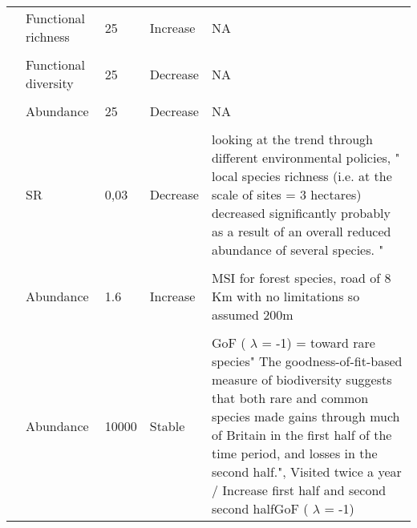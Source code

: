 \documentclass[
  12pt,
  oneside]{report}
\begin{document}
\begin{landscape}
\begin{longtable}[t]{llll>{\raggedright\arraybackslash}p{30em}}
\cite{schipper_contrasting_2016} & Functional richness & 25 & Increase & NA\\
\cellcolor{gray!6}{\cite{schipper_contrasting_2016}} & \cellcolor{gray!6}{Functional evenness} & \cellcolor{gray!6}{25} & \cellcolor{gray!6}{Increase} & \cellcolor{gray!6}{NA}\\
\cite{schipper_contrasting_2016} & Functional diversity & 25 & Decrease & NA\\
\cellcolor{gray!6}{\cite{sorte_changes_2005}} & \cellcolor{gray!6}{SR} & \cellcolor{gray!6}{25} & \cellcolor{gray!6}{Increase} & \cellcolor{gray!6}{The metric is meaned over each road. Area of the road = 50*(pi*400\^2) with 50 census point per road and a census radius of 400m}\\
\addlinespace
\cite{sorte_changes_2005} & Abundance & 25 & Decrease & NA\\
\cellcolor{gray!6}{\cite{sorte_changes_2005}} & \cellcolor{gray!6}{Diversity} & \cellcolor{gray!6}{25} & \cellcolor{gray!6}{Decrease} & \cellcolor{gray!6}{Metric = evenness}\\
\cite{wretenberg_changes_2010} & SR & 0,03 & Decrease & looking at the trend through different environmental policies, " local species richness (i.e. at the scale of sites = 3 hectares) decreased significantly probably as a result of an overall reduced abundance of several species. "\\
\cellcolor{gray!6}{\cite{ram_what_2017}} & \cellcolor{gray!6}{SR} & \cellcolor{gray!6}{3,2} & \cellcolor{gray!6}{Increase} & \cellcolor{gray!6}{SR for forest species meaned over roads, spatial grain = 8* .4 with road of 8 Km and census radius no limitations so assumed 200m}\\
\cite{ram_what_2017} & Abundance & 1.6 & Increase & MSI for forest species, road of 8 Km with no limitations so assumed 200m\\
\addlinespace
\cellcolor{gray!6}{\cite{harrison_quantifying_2016}} & \cellcolor{gray!6}{Abundance} & \cellcolor{gray!6}{10000} & \cellcolor{gray!6}{Increase} & \cellcolor{gray!6}{Geomteric mean of species abundance, they predict the abundance with resolution of 1 Km² and then computed the metric for each 10000 Km² cell across Great Britain, Visited twice a year}\\
\cite{harrison_quantifying_2016} & Abundance & 10000 & Stable & GoF ( $\lambda$ = -1) = toward rare species" The goodness-of-fit-based measure of biodiversity suggests that both rare and common species made gains through much of Britain in the first half of the time period, and losses in the second half.", Visited twice a year / Increase first half and second second halfGoF ( $\lambda$ = -1)\\

\end{longtable}
\end{landscape}
\end{document}
